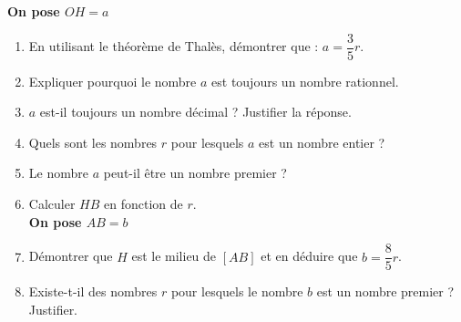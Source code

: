 \begin{exercice}
   {\bf On pose $OH = a$}
   \begin{enumerate}
      \item En utilisant le théorème de Thalès, démontrer que : $a =\dfrac35r$.
      \item Expliquer pourquoi le nombre $a$ est toujours un nombre rationnel.
      \item $a$ est-il toujours un nombre décimal ? Justifier la réponse.
      \item Quels sont les nombres $r$ pour lesquels $a$ est un nombre entier ?
      \item Le nombre $a$ peut-il être un nombre premier ?
      \item Calculer $HB$ en fonction de $r$. \\ [5pt]
      \hspace*{-0.5cm} {\bf On pose $AB = b$}
      \item Démontrer que $H$ est le milieu de $[AB]$ et en déduire que $b =\dfrac85r$. \smallskip
      \item Existe-t-il des nombres $r$ pour lesquels le nombre $b$ est un nombre premier ? Justifier.
   \end{enumerate}
\end{exercice}

